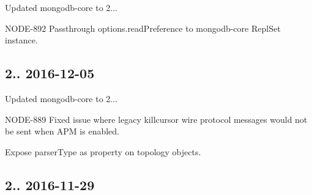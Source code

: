 \begin{DoxyItemize}
\item Updated mongodb-\/core to 2...
\item N\+O\+D\+E-\/892 Passthrough options.\+read\+Preference to mongodb-\/core Repl\+Set instance.
\end{DoxyItemize}

\subsection*{2.. 2016-\/12-\/05 }


\begin{DoxyItemize}
\item Updated mongodb-\/core to 2...
\item N\+O\+D\+E-\/889 Fixed issue where legacy killcursor wire protocol messages would not be sent when A\+PM is enabled.
\item Expose parser\+Type as property on topology objects.
\end{DoxyItemize}

\subsection*{2.. 2016-\/11-\/29 }


